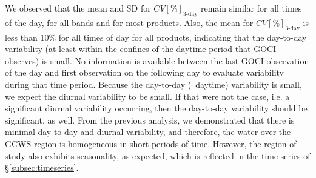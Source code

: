 \documentclass[remotesensing,article,submit,moreauthors,pdftex,10pt,a4paper]{Definitions/mdpi}
\begin{document}
We observed that the mean and SD for $CV[\%]_\text{3-day}$ remain similar for all times of the day, for all bands and for most products. Also, the mean for $CV[\%]_\text{3-day}$ is less than 10\% for all times of day for all products, indicating that the day-to-day variability (at least within the confines of the daytime period that GOCI observes) is small. No information is available between the last GOCI observation of the day and first observation on the following day to evaluate variability during that time period.  Because the day-to-day (~daytime) variability is small, we expect the diurnal variability to be small. If that were not the case, i.e. a significant diurnal variability occurring, then the day-to-day variability should be significant, as well. From the previous analysis, we demonstrated that there is minimal day-to-day and diurnal variability, and therefore, the water over the GCWS region is homogeneous in short periods of time. However, the region of study also exhibits seasonality, as expected, which is reflected in the time series of \S\ref{subsec:timeseries}. 
\end{document}
